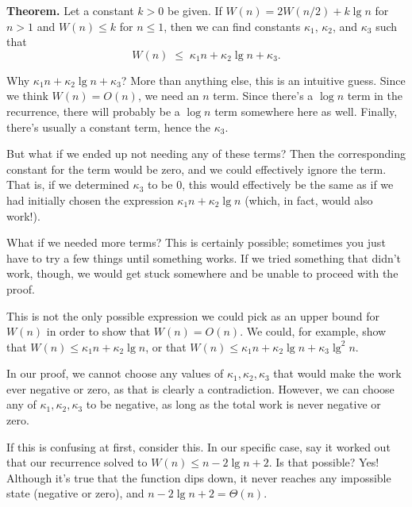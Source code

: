\begin{flex}
\begin{gram}
\textbf{Theorem.}
Let a constant $k > 0$ be given.  If $W(n) = 2 W(n/2) + k \lg n$ for $n >
1$ and $W(n) \leq k$ for $n \leq 1$, then we can find constants $\kappa_1$,
$\kappa_2$, and $\kappa_3$ such that \[ W(n) \;\leq\; \kappa_1 n + \kappa_2 \lg n + \kappa_3.\]
\end{gram}

\begin{note}
Why $\kappa_1 n + \kappa_2 \lg n + \kappa_3$? More than anything else,
this is an intuitive guess. Since we think $W(n) = O(n)$, we need an $n$ term.
Since there's a $\log n$ term in the recurrence, there will probably be a $\log n$
term somewhere here as well. Finally, there's usually a constant term, hence the
$\kappa_3$.

But what if we ended up not needing any of these terms? Then the corresponding
constant for the term would be zero, and we could effectively ignore the term.
That is, if we determined $\kappa_3$ to be 0, this would effectively be the same
as if we had initially chosen the expression $\kappa_1 n + \kappa_2 \lg n$
(which, in fact, would also work!).

What if we needed more terms? This is certainly possible; sometimes you just
have to try a few things until something works. If we tried something that didn't
work, though, we would get stuck somewhere and be unable to proceed with the proof.
\end{note}

\begin{note}
This is not the only possible expression we could pick as an upper bound for
$W(n)$ in order to show that $W(n) = O(n)$. We could, for example, show
that $W(n) \leq \kappa_1 n + \kappa_2 \lg n$, or that
$W(n) \leq \kappa_1 n + \kappa_2 \lg n + \kappa_3 \lg^2 n$.
\end{note}

\begin{note}
In our proof, we cannot choose any values of $\kappa_1, \kappa_2, \kappa_3$
that would make the work ever negative or zero, as that is clearly a contradiction.
However, we can choose any of $\kappa_1, \kappa_2, \kappa_3$ to be negative, as
long as the total work is never negative or zero.

If this is confusing at first, consider this. In our specific case, say
it worked out that our recurrence solved to $W(n) \leq n - 2 \lg n + 2$.
Is that possible? Yes! Although it's true that the function dips down, it never
reaches any impossible state (negative or zero), and $n - 2 \lg n + 2 = \Theta(n)$.
\end{note}
\end{flex}

